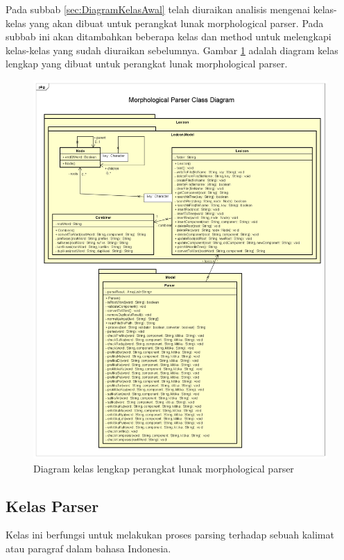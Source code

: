 Pada subbab \ref{sec:DiagramKelasAwal} telah diuraikan analisis mengenai kelas-kelas yang akan dibuat untuk perangkat lunak morphological parser. Pada subbab ini akan ditambahkan beberapa kelas dan method untuk melengkapi kelas-kelas yang sudah diuraikan sebelumnya. Gambar \ref{gambar-diagram-kelas-final} adalah diagram kelas lengkap yang dibuat untuk perangkat lunak morphological parser.

\begin{figure}[H]
\centering
\includegraphics[scale=0.4]{Gambar/gambar-diagram-kelas-final}
\caption{Diagram kelas lengkap perangkat lunak morphological parser} 
\label{gambar-diagram-kelas-final}
\end{figure}

\subsection{Kelas Parser}
\label{sec:kelasParser}

Kelas ini berfungsi untuk melakukan proses parsing terhadap sebuah kalimat atau paragraf dalam bahasa Indonesia.

